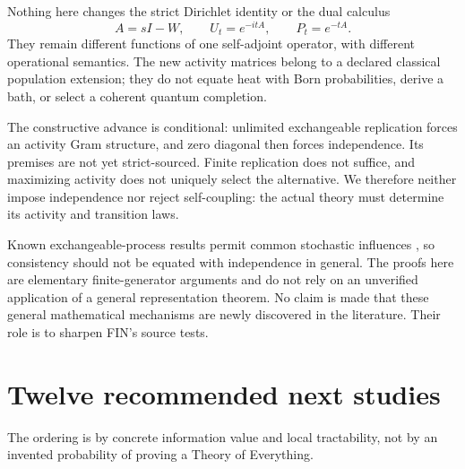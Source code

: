\documentclass[11pt,a4paper]{article}
\begin{document}
Nothing here changes the strict Dirichlet identity or the dual calculus
\[
 A=sI-W,\qquad
 U_t=e^{-itA},\qquad P_t=e^{-tA}.
\]
They remain different functions of one self-adjoint operator, with
different operational semantics. The new activity matrices belong to a
declared classical population extension; they do not equate heat with
Born probabilities, derive a bath, or select a coherent quantum completion.

The constructive advance is conditional: unlimited exchangeable replication
forces an activity Gram structure, and zero diagonal then forces
independence. Its premises are not yet strict-sourced. Finite replication
does not suffice, and maximizing activity does not uniquely select the
alternative. We therefore neither impose independence nor reject
self-coupling: the actual theory must determine its activity and
transition laws.

Known exchangeable-process results permit common stochastic influences
\cite{crane}, so consistency should not be equated with independence in
general. The proofs here are elementary finite-generator arguments and do
not rely on an unverified application of a general representation theorem.
No claim is made that these general mathematical mechanisms are newly
discovered in the literature. Their role is to sharpen FIN's source tests.

\section{Twelve recommended next studies}

The ordering is by concrete information value and local tractability, not
by an invented probability of proving a Theory of Everything.
\end{document}
